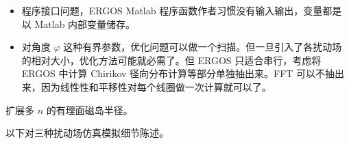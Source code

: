   
  
    
  
\begin{itemize}
    \item 程序接口问题，ERGOS Matlab 程序函数作者习惯没有输入输出，变量都是以 Matlab 内部变量储存。
    \item 对角度 $\varphi$ 这种有界参数，优化问题可以做一个扫描。但一旦引入了各扰动场的相对大小，优化方法可能就必需了。但 ERGOS 只适合串行，考虑将 ERGOS 中计算 Chirikov 径向分布计算等部分单独抽出来。FFT 可以不抽出来，因为线性性和平移性对每个线圈做一次计算就可以了。
\end{itemize}
    
扩展多 $n$ 的有理面磁岛半径。

    
  

以下对三种扰动场仿真模拟细节陈述。










